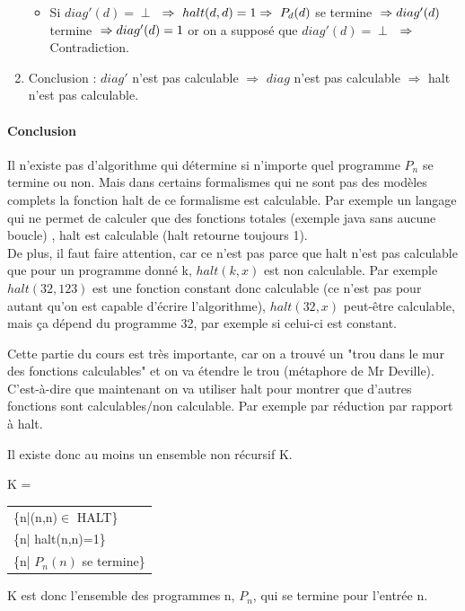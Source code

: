 \begin{enumerate}
\begin{itemize}
			\item Si $diag'(d)= \perp$ $\\
			\Rightarrow \  halt(d,d) = 1 \\
			\Rightarrow \ P_d(d)$ se termine $ \\
			\Rightarrow diag'(d)$ termine $ \\
			\Rightarrow diag'(d) = 1$ or on a supposé que $diag'(d) = \perp$ $ \\
			\Rightarrow $
			Contradiction.
		\end{itemize}
	\item Conclusion : $diag'$ n'est pas calculable $ \Rightarrow $ $diag$
	n'est pas calculable $ \Rightarrow $ halt n'est pas calculable.

\end{enumerate}

\paragraph{Conclusion} Il n'existe pas d'algorithme qui détermine si n'importe 
quel programme $P_n$ se termine ou non. Mais dans certains formalismes qui ne 
sont pas des modèles complets la fonction halt de ce formalisme est calculable.
Par exemple un langage qui ne permet de calculer 
que des fonctions totales (exemple java sans aucune boucle)
, halt est calculable (halt retourne toujours 1). \\

De plus, il faut faire attention, car ce n'est pas parce que halt n'est pas 
calculable que pour un programme donné k, $halt(k,x)$ est non calculable. Par 
exemple $halt(32,123)$ est une fonction constant donc calculable (ce n'est pas 
pour autant qu'on est capable d'écrire l'algorithme), $halt(32,x)$ peut-être 
calculable, mais ça dépend du 
programme 32, par exemple si celui-ci est constant.

\begin{myrem}
	Cette partie du cours est très importante, car on a trouvé un 
	"trou dans le mur des fonctions calculables" et on va étendre le trou (métaphore
	de Mr Deville). C'est-à-dire que maintenant on va utiliser halt pour montrer 
	que d'autres fonctions sont calculables/non calculable. Par exemple 
	par réduction par rapport à halt.
\end{myrem}

Il existe donc au moins un ensemble non récursif
K.

\begin{mydef}[K]
	K = 
	\begin{tabular}{l}
		\{n|(n,n)$\in$ HALT\}\\
		\{n| halt(n,n)=1\}\\
		\{n| $P_n(n)$ se termine\} \\
	\end{tabular}
	K est donc l'ensemble des programmes n, $P_n$, qui
	se termine pour l'entrée n.
\end{mydef}
	
